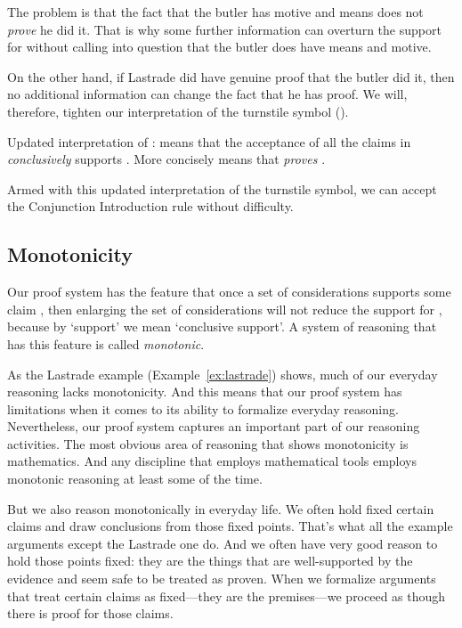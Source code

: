 The problem is that the fact that the butler has motive and means does not 
\emph{prove} he did it. That is why some further information can overturn the 
support for  without calling into question that the butler does have means 
and motive. 

On the other hand, if Lastrade did have genuine proof that the butler did it, 
then no additional information can change the fact that he has proof.  We will, 
therefore, tighten our interpretation of the turnstile symbol (\p{\lproves}). 

\begin{infrule}

 \item[Updated interpretation of \p{\lproves}:]
 means that the acceptance of all the claims in \p{\Gamma} 
\emph{conclusively} supports . More concisely  means 
that \p{\Gamma} \emph{proves} . 

\end{infrule}

Armed with this updated interpretation of the turnstile symbol, we can accept 
the Conjunction Introduction rule without difficulty. 


\subsection{Monotonicity}

Our proof system has the feature that once a set of considerations supports some 
claim , then enlarging the set of considerations will not reduce the 
support for , because by `support' we mean `conclusive support'.  A system 
of reasoning that has this feature is called \emph{monotonic}. 

As the Lastrade example (Example~\ref{ex:lastrade}) shows, much of our everyday 
reasoning lacks monotonicity. And this means that our proof system has 
limitations when it comes to its ability to formalize everyday reasoning.  
Nevertheless, our proof system captures an important part of our reasoning 
activities. The most obvious area of reasoning that shows monotonicity is 
mathematics. And any discipline that employs mathematical tools employs 
monotonic reasoning at least some of the time.

But we also reason monotonically in everyday life. We often hold fixed certain 
claims and draw conclusions from those fixed points.  That's what all the 
example arguments except the Lastrade one do.  And we often have very good 
reason to hold those points fixed: they are the things that are well-supported 
by the evidence and seem safe to be treated as proven. When we formalize 
arguments that treat certain claims as fixed---they are the premises---we 
proceed as though there is proof for those claims. 


